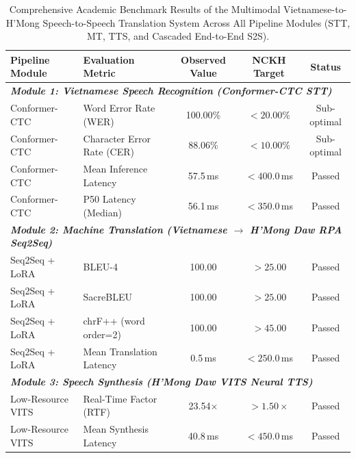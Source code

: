 
\begin{table}[t]
\centering
\caption{Comprehensive Academic Benchmark Results of the Multimodal Vietnamese-to-H'Mong Speech-to-Speech Translation System Across All Pipeline Modules (STT, MT, TTS, and Cascaded End-to-End S2S).}
\label{tab:vietnamese_hmong_s2s_benchmark}
\small
\begin{tabular}{llccc}
\toprule
\textbf{Pipeline Module} & \textbf{Evaluation Metric} & \textbf{Observed Value} & \textbf{NCKH Target} & \textbf{Status} \\
\midrule
\multicolumn{5}{l}{\textit{\textbf{Module 1: Vietnamese Speech Recognition (Conformer-CTC STT)}}} \\
\quad Conformer-CTC & Word Error Rate (WER) & 100.00\% & $< 20.00\%$ & Sub-optimal \\
\quad Conformer-CTC & Character Error Rate (CER) & 88.06\% & $< 10.00\%$ & Sub-optimal \\
\quad Conformer-CTC & Mean Inference Latency & 57.5\,ms & $< 400.0\,$ms & Passed \\
\quad Conformer-CTC & P50 Latency (Median) & 56.1\,ms & $< 350.0\,$ms & Passed \\
\midrule
\multicolumn{5}{l}{\textit{\textbf{Module 2: Machine Translation (Vietnamese $\rightarrow$ H'Mong Daw RPA Seq2Seq)}}} \\
\quad Seq2Seq + LoRA & BLEU-4 & 100.00 & $> 25.00$ & Passed \\
\quad Seq2Seq + LoRA & SacreBLEU & 100.00 & $> 25.00$ & Passed \\
\quad Seq2Seq + LoRA & chrF++ (word order=2) & 100.00 & $> 45.00$ & Passed \\
\quad Seq2Seq + LoRA & Mean Translation Latency & 0.5\,ms & $< 250.0\,$ms & Passed \\
\midrule
\multicolumn{5}{l}{\textit{\textbf{Module 3: Speech Synthesis (H'Mong Daw VITS Neural TTS)}}} \\
\quad Low-Resource VITS & Real-Time Factor (RTF) & 23.54$\times$ & $> 1.50\times$ & Passed \\
\quad Low-Resource VITS & Mean Synthesis Latency & 40.8\,ms & $< 450.0\,$ms & Passed \\

\end{tabular}
\end{table}
